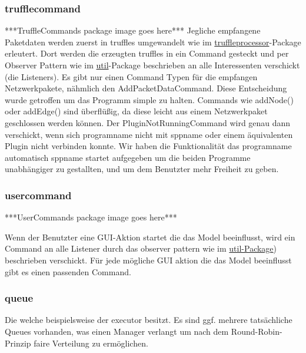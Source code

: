 \subsubsection{trufflecommand}
***TruffleCommands package image goes here***
\newline
\newline
Jegliche empfangene Paketdaten werden zuerst in \glspl{truffle} umgewandelt wie
im \hyperref[subsubsec:truffleprocessor]{truffleprocessor}-Package erleutert. Dort
werden die erzeugten \glspl{truffle} in ein Command gesteckt und per Observer Pattern
wie im \hyperref[subsec:util]{util}-Package beschrieben an alle In­te­r­es­senten verschickt
(die Listeners).
\newline
\newline
Es gibt nur einen Command Typen für die empfangen Netzwerkpakete, nähmlich den
AddPacketDataCommand. Diese Entscheidung wurde getroffen um das Programm simple
zu halten. Commands wie addNode() oder addEdge() sind überflüßig, da diese leicht aus
einem Netzwerkpaket geschlossen werden können.
\newline
\newline
Der PluginNotRunningCommand wird genau dann verschickt, wenn sich \gls{programname}
nicht mit \gls{sppname} oder einem äquivalenten Plugin nicht verbinden konnte. Wir
haben die Funktionalität das \gls{programname} automatisch \gls{sppname} startet
aufgegeben um die beiden Programme unabhängiger zu gestallten, und um dem Benutzter
mehr Freiheit zu geben.

\subsubsection{usercommand}
***UserCommands package image goes here***
\newline
\newline

Wenn der Benutzter eine GUI-Aktion startet die das Model beeinflusst,
wird ein Command an alle Listener durch das observer pattern wie im
\hyperref[subsec:util]{util-Package}) beschrieben verschickt. Für jede mögliche
GUI aktion die das Model beeinflusst gibt es einen passenden Command.

\subsubsection{queue}
Die  welche beispielsweise der executor besitzt. Es
sind ggf. mehrere tatsächliche Queues vorhanden, was einen Manager verlangt
um nach dem Round-Robin-Prinzip faire Verteilung zu ermöglichen.

